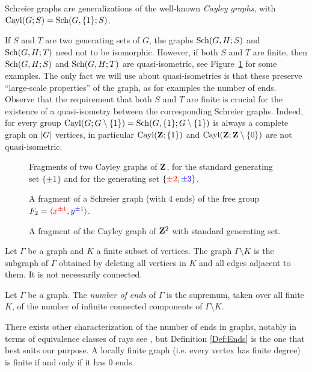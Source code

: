 Schreier graphs are generalizations of the well-known \emph{Cayley graphs}, with $\operatorname{Cayl}(G;S)=\operatorname{Sch}(G,\{1\};S)$.

If $S$ and $T$ are two generating sets of $G$, the graphs $\operatorname{Sch}(G,H;S)$ and $\operatorname{Sch}(G,H;T)$ need not to be isomorphic. However, if both $S$ and $T$ are finite, then $\operatorname{Sch}(G,H;S)$ and $\operatorname{Sch}(G,H;T)$ are quasi-isometric, see Figure~\ref{Figure:CayleyOfZ} for some examples. The only fact we will use about quasi-isometries is that these preserve ``large-scale properties'' of the graph, as for examples the number of ends.
Observe that the requirement that both $S$ and $T$ are finite is crucial for the existence of a quasi-isometry between the corresponding Schreier graphs. Indeed, for every group  $\operatorname{Cayl}(G;G\setminus\{1\})=\operatorname{Sch}(G,\{1\};G\setminus\{1\})$ is always a complete graph on $\lvert G\rvert$ vertices, in particular  $\operatorname{Cayl}(\mathbf{Z};\{1\})$ and $\operatorname{Cayl}(\mathbf{Z};\mathbf{Z}\setminus\{0\})$ are not quasi-isometric.

%
%
\begin{figure}[htbp]\centering

\caption{Fragments of two Cayley graphs of $\mathbf{Z}$, for the standard generating set $\{\pm1\}$ and for the generating set $\{\textcolor{red}{\pm2},\textcolor{blue}{\pm3\}}$.}
\label{Figure:CayleyOfZ}
\end{figure}
\begin{figure}[htbp]\centering

\caption{A fragment of a Schreier graph (with $4$ ends) of the free group $F_2=\langle \textcolor{red}{x^{\pm1}},\textcolor{blue}{y^{\pm1}}\rangle$.}
\label{Figure:SchreierOfF2}
\end{figure}
\begin{figure}[htbp]\centering

\caption{A fragment of the Cayley graph of $\mathbf{Z}^2$ with standard generating set.}
\label{Figure:CayleyOfZ2}
\end{figure}
%
%

Let $\Gamma$ be a graph and $K$ a finite subset of vertices. The graph $\Gamma\setminus K$ is the subgraph of $\Gamma$ obtained by deleting all vertices in $K$ and all edges adjacent to them. It is not necessarily connected.
\begin{defn}\label{Def:Ends}
Let $\Gamma$ be a graph. The \emph{number of ends} of $\Gamma$ is the supremum, taken over all finite $K$, of the number of infinite connected components of $\Gamma\setminus K$.
\end{defn}
There exists other characterization of the number of ends in graphs, notably in terms of equivalence classes of rays see \cite{}, but Definition \ref{Def:Ends} is the one that best suits our purpose.
A locally finite graph (i.e. every vertex has finite degree) is finite if and only if it has $0$ ends.

